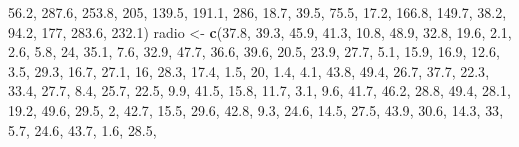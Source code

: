 \documentclass[]{book}
\newenvironment{Shaded}{\begin{snugshade}}{\end{snugshade}}
\newcommand{\KeywordTok}[1]{\textcolor[rgb]{0.13,0.29,0.53}{\textbf{#1}}}
\newcommand{\DecValTok}[1]{\textcolor[rgb]{0.00,0.00,0.81}{#1}}
\newcommand{\FloatTok}[1]{\textcolor[rgb]{0.00,0.00,0.81}{#1}}
\newcommand{\StringTok}[1]{\textcolor[rgb]{0.31,0.60,0.02}{#1}}
\newcommand{\NormalTok}[1]{#1}
\begin{document}
\begin{Shaded}
\begin{Highlighting}[]
    \FloatTok{56.2}\NormalTok{, }\FloatTok{287.6}\NormalTok{, }\FloatTok{253.8}\NormalTok{, }\DecValTok{205}\NormalTok{, }\FloatTok{139.5}\NormalTok{, }\FloatTok{191.1}\NormalTok{, }\DecValTok{286}\NormalTok{, }\FloatTok{18.7}\NormalTok{, }\FloatTok{39.5}\NormalTok{, }\FloatTok{75.5}\NormalTok{, }\FloatTok{17.2}\NormalTok{, }\FloatTok{166.8}\NormalTok{, }
    \FloatTok{149.7}\NormalTok{, }\FloatTok{38.2}\NormalTok{, }\FloatTok{94.2}\NormalTok{, }\DecValTok{177}\NormalTok{, }\FloatTok{283.6}\NormalTok{, }\FloatTok{232.1}\NormalTok{)}
\NormalTok{radio <-}\StringTok{ }\KeywordTok{c}\NormalTok{(}\FloatTok{37.8}\NormalTok{, }\FloatTok{39.3}\NormalTok{, }\FloatTok{45.9}\NormalTok{, }\FloatTok{41.3}\NormalTok{, }\FloatTok{10.8}\NormalTok{, }\FloatTok{48.9}\NormalTok{, }\FloatTok{32.8}\NormalTok{, }\FloatTok{19.6}\NormalTok{, }\FloatTok{2.1}\NormalTok{, }\FloatTok{2.6}\NormalTok{, }\FloatTok{5.8}\NormalTok{, }\DecValTok{24}\NormalTok{, }
    \FloatTok{35.1}\NormalTok{, }\FloatTok{7.6}\NormalTok{, }\FloatTok{32.9}\NormalTok{, }\FloatTok{47.7}\NormalTok{, }\FloatTok{36.6}\NormalTok{, }\FloatTok{39.6}\NormalTok{, }\FloatTok{20.5}\NormalTok{, }\FloatTok{23.9}\NormalTok{, }\FloatTok{27.7}\NormalTok{, }\FloatTok{5.1}\NormalTok{, }\FloatTok{15.9}\NormalTok{, }\FloatTok{16.9}\NormalTok{, }\FloatTok{12.6}\NormalTok{, }
    \FloatTok{3.5}\NormalTok{, }\FloatTok{29.3}\NormalTok{, }\FloatTok{16.7}\NormalTok{, }\FloatTok{27.1}\NormalTok{, }\DecValTok{16}\NormalTok{, }\FloatTok{28.3}\NormalTok{, }\FloatTok{17.4}\NormalTok{, }\FloatTok{1.5}\NormalTok{, }\DecValTok{20}\NormalTok{, }\FloatTok{1.4}\NormalTok{, }\FloatTok{4.1}\NormalTok{, }\FloatTok{43.8}\NormalTok{, }\FloatTok{49.4}\NormalTok{, }\FloatTok{26.7}\NormalTok{, }
    \FloatTok{37.7}\NormalTok{, }\FloatTok{22.3}\NormalTok{, }\FloatTok{33.4}\NormalTok{, }\FloatTok{27.7}\NormalTok{, }\FloatTok{8.4}\NormalTok{, }\FloatTok{25.7}\NormalTok{, }\FloatTok{22.5}\NormalTok{, }\FloatTok{9.9}\NormalTok{, }\FloatTok{41.5}\NormalTok{, }\FloatTok{15.8}\NormalTok{, }\FloatTok{11.7}\NormalTok{, }\FloatTok{3.1}\NormalTok{, }\FloatTok{9.6}\NormalTok{, }
    \FloatTok{41.7}\NormalTok{, }\FloatTok{46.2}\NormalTok{, }\FloatTok{28.8}\NormalTok{, }\FloatTok{49.4}\NormalTok{, }\FloatTok{28.1}\NormalTok{, }\FloatTok{19.2}\NormalTok{, }\FloatTok{49.6}\NormalTok{, }\FloatTok{29.5}\NormalTok{, }\DecValTok{2}\NormalTok{, }\FloatTok{42.7}\NormalTok{, }\FloatTok{15.5}\NormalTok{, }\FloatTok{29.6}\NormalTok{, }\FloatTok{42.8}\NormalTok{, }
    \FloatTok{9.3}\NormalTok{, }\FloatTok{24.6}\NormalTok{, }\FloatTok{14.5}\NormalTok{, }\FloatTok{27.5}\NormalTok{, }\FloatTok{43.9}\NormalTok{, }\FloatTok{30.6}\NormalTok{, }\FloatTok{14.3}\NormalTok{, }\DecValTok{33}\NormalTok{, }\FloatTok{5.7}\NormalTok{, }\FloatTok{24.6}\NormalTok{, }\FloatTok{43.7}\NormalTok{, }\FloatTok{1.6}\NormalTok{, }\FloatTok{28.5}\NormalTok{, }

\end{Highlighting}
\end{Shaded}
\end{document}
